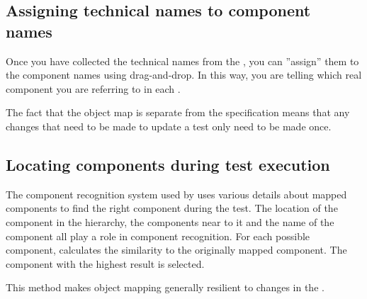 \subsection{Assigning technical names to component names}
Once you have collected the technical names from the \gdaut{}, you can ''assign'' them to the component names using drag-and-drop. In this way, you are telling \app{} which real component you are referring to in each \gdstep{}. 

The fact that the object map is separate from the specification means that any changes that need to be made to update a test only need to be made once. 

\subsection{Locating components during test execution}
 The component recognition system used by \app{} uses various details about mapped components to find the right component during the test. The location of the component in the \gdaut{} hierarchy, the components near to it and the name of the component all play a role in component recognition. For each possible component, \app{} calculates the similarity to the originally mapped component. The component with the highest result is selected. 

This method makes object mapping generally resilient to changes in the \gdaut{}. 
 


